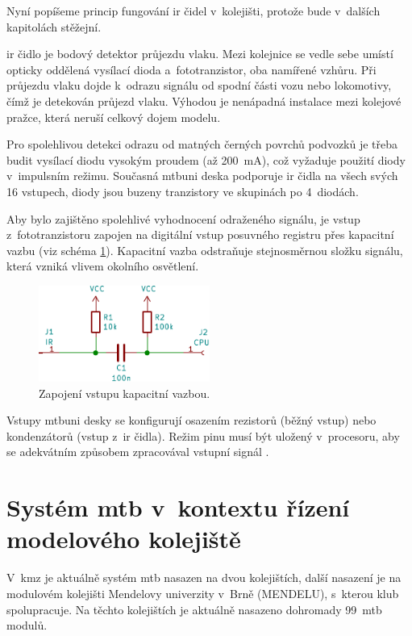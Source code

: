 Nyní popíšeme princip fungování \gls{ir} čidel v~kolejišti, protože bude v~dalších
kapitolách stěžejní.

\gls{ir} čidlo je bodový detektor průjezdu vlaku. Mezi kolejnice se vedle sebe umístí
opticky oddělená vysílací dioda a~fototranzistor, oba namířené vzhůru. Při
průjezdu vlaku dojde k~odrazu signálu od spodní části vozu nebo lokomotivy,
čímž je detekován průjezd vlaku. Výhodou je nenápadná instalace mezi kolejové
pražce, která neruší celkový dojem modelu.

Pro spolehlivou detekci odrazu od matných černých povrchů podvozků je třeba
budit vysílací diodu vysokým proudem (až 200~mA), což vyžaduje použití
diody v~impulsním režimu. Současná \gls{mtbuni} deska podporuje \gls{ir} čidla na
všech svých 16 vstupech, diody jsou buzeny tranzistory ve skupinách po
4~diodách.

Aby bylo zajištěno spolehlivé vyhodnocení odraženého signálu, je vstup
z~fototranzistoru zapojen na digitální vstup posuvného registru přes kapacitní
vazbu (viz schéma \ref{fig:cap-bind}). Kapacitní vazba odstraňuje stejnosměrnou
složku signálu, která vzniká vlivem okolního osvětlení.

\begin{figure}[ht]
\includegraphics[width=0.5\textwidth]{data/cap-bind/capacitive-bind-example.pdf}
\caption{Zapojení vstupu kapacitní vazbou.}
\label{fig:cap-bind}
\end{figure}

Vstupy \gls{mtbuni} desky se konfigurují osazením rezistorů (běžný
vstup) nebo kondenzátorů (vstup z~\gls{ir} čidla). Režim pinu musí být
uložený v~procesoru, aby se adekvátním způsobem zpracovával vstupní signál
\cite{mtbuni22-specs}.


\section{Systém \gls{mtb} v~kontextu řízení modelového kolejiště} \label{sec:mtb_context}

V~\gls{kmz} je aktuálně systém \gls{mtb} nasazen na dvou kolejištích, další
nasazení je na modulovém kolejišti Mendelovy univerzity v~Brně (MENDELU),
s~kterou klub spolupracuje. Na těchto kolejištích je aktuálně nasazeno
dohromady 99~\gls{mtb} modulů.


